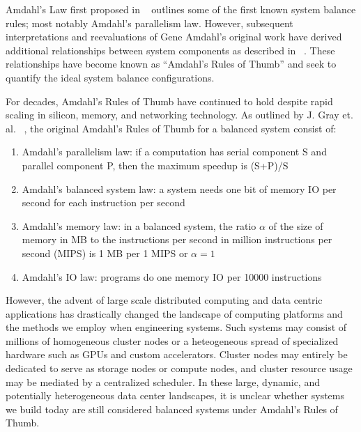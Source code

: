 \documentclass{sig-alternate}
\begin{document}

Amdahl's Law first proposed in ~\cite{Amdahl:1967:VSP:1465482.1465560} outlines some of the first known system balance rules; most notably Amdahl's parallelism law.
However, subsequent interpretations and reevaluations of Gene Amdahl's original work have derived additional relationships between system components as described in ~\cite{Gustafson:1988:RAL:42411.42415, Hill:2008:ALM:1449375.1449387, export:68636, Bell:2006:PCS:1110638.1110681}.
These relationships have become known as ``Amdahl's Rules of Thumb'' and seek to quantify the ideal system balance configurations.

For decades, Amdahl's Rules of Thumb have continued to hold despite rapid scaling in silicon, memory, and networking technology.
As outlined by J. Gray et. al. ~\cite{export:68636}, the original Amdahl's Rules of Thumb for a balanced system consist of:
\begin{enumerate}
\item Amdahl's parallelism law: if a computation has serial component S and parallel component P, then the maximum speedup is (S+P)/S
\item Amdahl's balanced system law: a system needs one bit of memory IO per second for each instruction per second
\item Amdahl's memory law: in a balanced system, the ratio $\alpha$ of the size of memory in MB to the instructions per second in million instructions per second (MIPS) is 1 MB per 1 MIPS or $\alpha = 1$
\item Amdahl's IO law: programs do one memory IO per 10000 instructions
\end{enumerate}
However, the advent of large scale distributed computing and data centric applications has drastically changed the landscape of computing platforms and the methods we employ when engineering systems.
Such systems may consist of millions of homogeneous cluster nodes or a heteogeneous spread of specialized hardware such as GPUs and custom accelerators.
Cluster nodes may entirely be dedicated to serve as storage nodes or compute nodes, and cluster resource usage may be mediated by a centralized scheduler.
In these large, dynamic, and potentially heterogeneous data center landscapes, it is unclear whether systems we build today are still considered balanced systems under Amdahl's Rules of Thumb.
\end{document}
